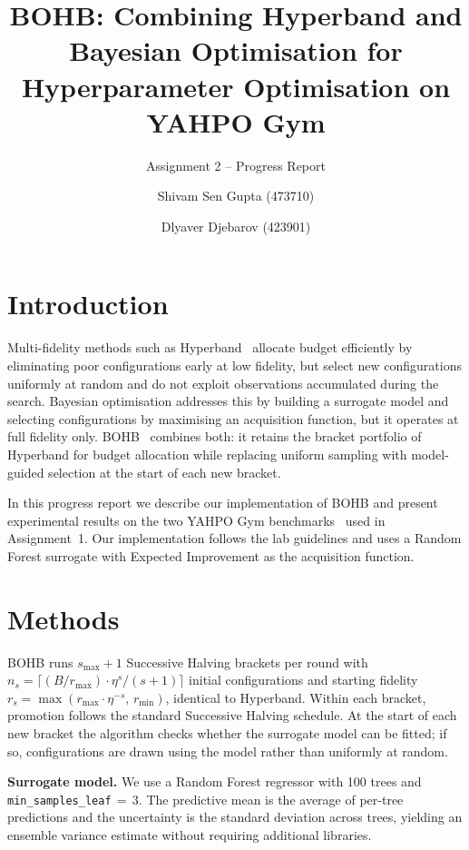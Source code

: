 \documentclass[review]{AIM_report}
\title{BOHB: Combining Hyperband and Bayesian Optimisation for Hyperparameter Optimisation on YAHPO Gym}
\subtitle{Assignment 2 -- Progress Report}
\author{Shivam Sen Gupta (473710) \and Dlyaver Djebarov (423901)}
\institute{RWTH Aachen University, Germany\\
\email{shivam.sengupta@rwth-aachen.de, dlyaver.djebarov@rwth-aachen.de}}
\begin{document}
\maketitle

\section{Introduction}

Multi-fidelity methods such as Hyperband~\cite{li2018hyperband} allocate budget efficiently by eliminating poor configurations early at low fidelity, but select new configurations uniformly at random and do not exploit observations accumulated during the search. Bayesian optimisation addresses this by building a surrogate model and selecting configurations by maximising an acquisition function, but it operates at full fidelity only. BOHB~\cite{falkner2018bohb} combines both: it retains the bracket portfolio of Hyperband for budget allocation while replacing uniform sampling with model-guided selection at the start of each new bracket.

In this progress report we describe our implementation of BOHB and present experimental results on the two YAHPO Gym benchmarks~\cite{pfisterer2022yahpo} used in Assignment~1. Our implementation follows the lab guidelines and uses a Random Forest surrogate with Expected Improvement as the acquisition function.

\section{Methods}

BOHB runs $s_{\max}{+}1$ Successive Halving brackets per round with $n_s{=}\lceil(B/r_{\max})\cdot\eta^s/(s{+}1)\rceil$ initial configurations and starting fidelity $r_s{=}\max(r_{\max}\cdot\eta^{-s},\,r_{\min})$, identical to Hyperband. Within each bracket, promotion follows the standard Successive Halving schedule. At the start of each new bracket the algorithm checks whether the surrogate model can be fitted; if so, configurations are drawn using the model rather than uniformly at random.

\textbf{Surrogate model.}
We use a Random Forest regressor with 100 trees and \texttt{min\_samples\_leaf}$\,{=}\,3$. The predictive mean is the average of per-tree predictions and the uncertainty is the standard deviation across trees, yielding an ensemble variance estimate without requiring additional libraries.
\end{document}
